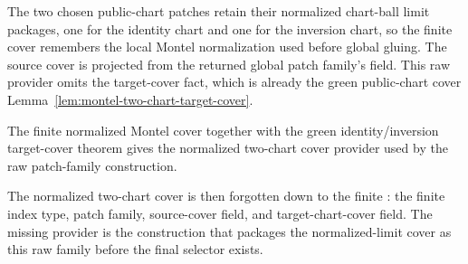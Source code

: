 \begin{lemma}
\label{lem:montel-normalized-limit-two-chart-cover-without-target-cover}
The two chosen public-chart patches retain their normalized chart-ball limit
packages, one for the identity chart and one for the inversion chart, so the
finite cover remembers the local Montel normalization used before global
gluing. The source cover is projected from the returned global patch family's
 field. This raw provider omits the target-cover fact, which
is already the green public-chart cover
Lemma~\ref{lem:montel-two-chart-target-cover}.
\end{lemma}

\begin{lemma}
\label{lem:montel-normalized-limit-two-chart-cover}
The finite normalized Montel cover together with the green identity/inversion
target-cover theorem gives the normalized two-chart cover provider used by the
raw patch-family construction.
\end{lemma}

\begin{lemma}
\label{lem:montel-global-patch-family-packaging}
The normalized two-chart cover is then forgotten down to the finite
: the finite index type, patch family,
source-cover field, and target-chart-cover field. The missing provider is the
construction that packages the normalized-limit cover as this raw family before
the final selector exists.
\end{lemma}

